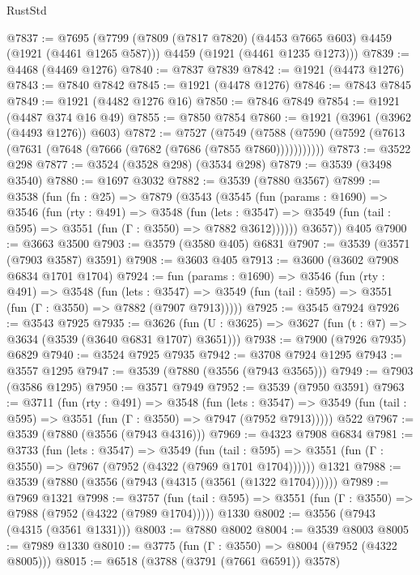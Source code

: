 \begin{lexlean}{RustStd}
\begin{coremodule}
@7837 := @7695
    (@7799
      (@7809 (@7817 @7820) (@4453 @7665 @603) @4459 (@1921 (@4461 @1265 @587)))
      @4459
      (@1921 (@4461 @1235 @1273)))
@7839 := @4468 (@4469 @1276)
@7840 := @7837 @7839
@7842 := @1921 (@4473 @1276)
@7843 := @7840 @7842
@7845 := @1921 (@4478 @1276)
@7846 := @7843 @7845
@7849 := @1921 (@4482 @1276 @16)
@7850 := @7846 @7849
@7854 := @1921 (@4487 @374 @16 @49)
@7855 := @7850 @7854
@7860 := @1921 (@3961 (@3962 (@4493 @1276)) @603)
@7872 := @7527
    (@7549 (@7588 (@7590 (@7592 (@7613 (@7631 (@7648 (@7666 (@7682 (@7686 (@7855 @7860)))))))))))
@7873 := @3522 @298
@7877 := @3524 (@3528 @298) (@3534 @298)
@7879 := @3539 (@3498 @3540)
@7880 := @1697 @3032
@7882 := @3539 (@7880 @3567)
@7899 := @3538
    (fun (fn : @25) =>
    @7879
      (@3543
        (@3545
          (fun (params : @1690) =>
          @3546
            (fun (rty : @491) =>
            @3548
              (fun (lets : @3547) =>
              @3549 (fun (tail : @595) => @3551 (fun (Γ : @3550) => @7882 @3612))))))
        @3657))
    @405
@7900 := @3663 @3500
@7903 := @3579 (@3580 @405) @6831
@7907 := @3539 (@3571 (@7903 @3587) @3591)
@7908 := @3603 @405
@7913 := @3600 (@3602 @7908 @6834 @1701 @1704)
@7924 := fun (params : @1690) =>
  @3546
    (fun (rty : @491) =>
    @3548
      (fun (lets : @3547) =>
      @3549 (fun (tail : @595) => @3551 (fun (Γ : @3550) => @7882 (@7907 @7913)))))
@7925 := @3545 @7924
@7926 := @3543 @7925
@7935 := @3626 (fun (U : @3625) => @3627 (fun (t : @7) => @3634 (@3539 (@3640 @6831 @1707) @3651)))
@7938 := @7900 (@7926 @7935) @6829
@7940 := @3524 @7925 @7935
@7942 := @3708 @7924 @1295
@7943 := @3557 @1295
@7947 := @3539 (@7880 (@3556 (@7943 @3565)))
@7949 := @7903 (@3586 @1295)
@7950 := @3571 @7949
@7952 := @3539 (@7950 @3591)
@7963 := @3711
    (fun (rty : @491) =>
    @3548
      (fun (lets : @3547) =>
      @3549 (fun (tail : @595) => @3551 (fun (Γ : @3550) => @7947 (@7952 @7913)))))
    @522
@7967 := @3539 (@7880 (@3556 (@7943 @4316)))
@7969 := @4323 @7908 @6834
@7981 := @3733
    (fun (lets : @3547) =>
    @3549
      (fun (tail : @595) => @3551 (fun (Γ : @3550) => @7967 (@7952 (@4322 (@7969 @1701 @1704))))))
    @1321
@7988 := @3539 (@7880 (@3556 (@7943 (@4315 (@3561 (@1322 @1704))))))
@7989 := @7969 @1321
@7998 := @3757
    (fun (tail : @595) => @3551 (fun (Γ : @3550) => @7988 (@7952 (@4322 (@7989 @1704)))))
    @1330
@8002 := @3556 (@7943 (@4315 (@3561 @1331)))
@8003 := @7880 @8002
@8004 := @3539 @8003
@8005 := @7989 @1330
@8010 := @3775 (fun (Γ : @3550) => @8004 (@7952 (@4322 @8005)))
@8015 := @6518 (@3788 (@3791 (@7661 @6591)) @3578)

\end{coremodule}
\end{lexlean}
